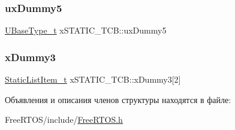 \mbox{\label{structx_s_t_a_t_i_c___t_c_b_ab950bb498901ef7291e49086e5a2efd0}} 
\subsubsection{\texorpdfstring{uxDummy5}{uxDummy5}}
{\footnotesize\ttfamily \mbox{\hyperlink{portmacro_8h_a646f89d4298e4f5afd522202b11cb2e6}{U\+Base\+Type\+\_\+t}} x\+S\+T\+A\+T\+I\+C\+\_\+\+T\+C\+B\+::ux\+Dummy5}

\mbox{\label{structx_s_t_a_t_i_c___t_c_b_a7f182aa8f5003494f63d975dabcb3ec1}} 
\subsubsection{\texorpdfstring{xDummy3}{xDummy3}}
{\footnotesize\ttfamily \mbox{\hyperlink{_free_r_t_o_s_8h_a1d31bc0472385a87424518da484d9e09}{Static\+List\+Item\+\_\+t}} x\+S\+T\+A\+T\+I\+C\+\_\+\+T\+C\+B\+::x\+Dummy3\mbox{[}2\mbox{]}}



Объявления и описания членов структуры находятся в файле\+:\begin{DoxyCompactItemize}
\item 
Free\+R\+T\+O\+S/include/\mbox{\hyperlink{_free_r_t_o_s_8h}{Free\+R\+T\+O\+S.\+h}}\end{DoxyCompactItemize}
